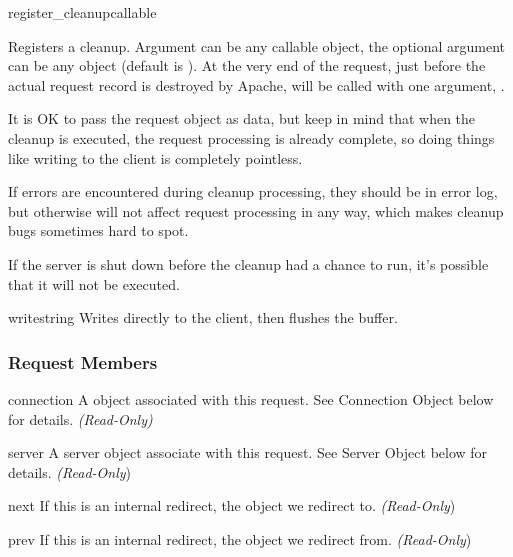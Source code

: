 \begin{methoddesc}[Request]{register_cleanup}{callable}

Registers a cleanup. Argument  can be any callable
object, the optional argument  can be any object (default is
). At the very end of the request, just before the actual
request record is destroyed by Apache,  will be called
with one argument, .

It is OK to pass the request object as data, but keep in mind that
when the cleanup is executed, the request processing is already
complete, so doing things like writing to the client is completely
pointless. 

If errors are encountered during cleanup processing, they should be in
error log, but otherwise will not affect request processing in any
way, which makes cleanup bugs sometimes hard to spot.

If the server is shut down before the cleanup had a chance to run,
it's possible that it will not be executed.

\end{methoddesc}

\begin{methoddesc}[Request]{write}{string}
Writes  directly to the client, then flushes the buffer. 
\end{methoddesc}

\subsubsection{Request Members\label{pyapi-mprequest-mem}}

\begin{memberdesc}[Request]{connection}
A  object associated with this request. See
Connection Object below for details.
\emph{(Read-Only)}
\end{memberdesc}

\begin{memberdesc}[Request]{server}
A server object associate with this request. See Server Object below
for details.
\emph{(Read-Only})
\end{memberdesc}

\begin{memberdesc}[Request]{next}
If this is an internal redirect, the  object we redirect to. 
\emph{(Read-Only})
\end{memberdesc}

\begin{memberdesc}[Request]{prev}
If this is an internal redirect, the  object we redirect from.
\emph{(Read-Only})
\end{memberdesc}

